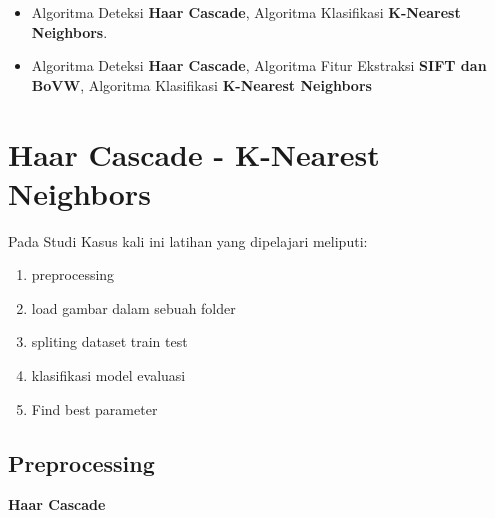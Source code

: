 \documentclass[
  letterpaper,
  DIV=11,
  numbers=noendperiod]{scrreprt}
\providecommand{\tightlist}{%
  \setlength{\itemsep}{0pt}\setlength{\parskip}{0pt}}\usepackage{longtable,booktabs,array}
\begin{document}
\begin{itemize}
\tightlist
\item
  Algoritma Deteksi \textbf{Haar Cascade}, Algoritma Klasifikasi
  \textbf{K-Nearest Neighbors}.\\
\item
  Algoritma Deteksi \textbf{Haar Cascade}, Algoritma Fitur Ekstraksi
  \textbf{SIFT dan BoVW}, Algoritma Klasifikasi \textbf{K-Nearest
  Neighbors}
\end{itemize}

\hypertarget{haar-cascade---k-nearest-neighbors}{%
\section*{Haar Cascade - K-Nearest
Neighbors}\label{haar-cascade---k-nearest-neighbors}}


Pada Studi Kasus kali ini latihan yang dipelajari meliputi:

\begin{enumerate}
\def\labelenumi{\arabic{enumi}.}
\tightlist
\item
  preprocessing\\
\item
  load gambar dalam sebuah folder\\
\item
  spliting dataset train test\\
\item
  klasifikasi model evaluasi\\
\item
  Find best parameter
\end{enumerate}

\hypertarget{preprocessing}{%
\subsection*{Preprocessing}\label{preprocessing}}

\textbf{Haar Cascade}
\end{document}
